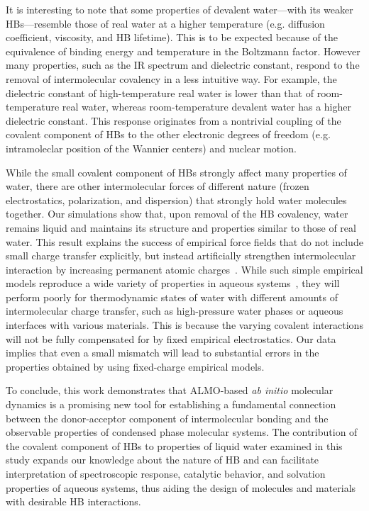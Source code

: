 \documentclass[10pt,amsmath,twocolumn,aps,prl,superscriptaddress,floatfix]{revtex4-1}
\begin{document}
It is interesting to note that some properties of devalent water---with its weaker HBs---resemble those of real water at a higher temperature (e.g. diffusion coefficient, viscosity, and HB lifetime). 
This is to be expected because of the equivalence of binding energy and temperature in the Boltzmann factor. However many properties, such as the IR spectrum and dielectric constant, respond to the removal of intermolecular covalency in a less intuitive way. 
For example, the dielectric constant of high-temperature real water is lower than that of room-temperature real water, whereas room-temperature devalent water has a higher dielectric constant. 
This response originates from a nontrivial coupling of the covalent component of HBs to the other electronic degrees of freedom (e.g. intramoleclar position of the Wannier centers) and nuclear motion.

While the small covalent component of HBs strongly affect many properties of water, there are other intermolecular forces of different nature (frozen electrostatics, polarization, and dispersion) that strongly hold water molecules together. 
Our simulations show that, upon removal of the HB covalency, water remains liquid and maintains its structure and properties similar to those of real water. 
This result explains the success of empirical force fields that do not include small charge transfer explicitly, but instead artificially strengthen intermolecular interaction by increasing permanent atomic charges~\cite{rick2016polarizable}. 
While such simple empirical models reproduce a wide variety of properties in aqueous systems~\cite{vega2011simulating}, they will perform poorly for thermodynamic states of water with different amounts of intermolecular charge transfer, such as high-pressure water phases or aqueous interfaces with various materials. 
This is because the varying covalent interactions will not be fully compensated for by fixed empirical electrostatics.
Our data implies that even a small mismatch will lead to substantial errors in the properties obtained by using fixed-charge empirical models.

To conclude, this work demonstrates that ALMO-based \emph{ab initio} molecular dynamics is a promising new tool for establishing a fundamental connection between the donor-acceptor component of intermolecular bonding and the observable properties of condensed phase molecular systems. 
The contribution of the covalent component of HBs to properties of liquid water examined in this study expands our knowledge about the nature of HB and can facilitate interpretation of spectroscopic response, catalytic behavior, and solvation properties of aqueous systems, thus aiding the design of molecules and materials with desirable HB interactions. 
 
\end{document}
